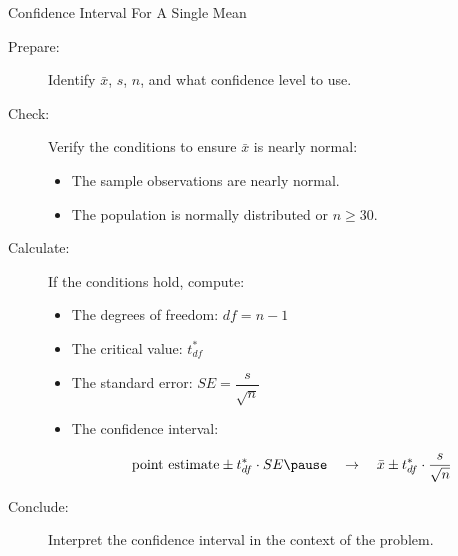 \documentclass{beamer}
\begin{document}
\begin{frame}
  \begin{block}{Confidence Interval For A Single Mean}
    \begin{description}
    \item[Prepare:] Identify $\bar{x}$, $s$, $n$, and what confidence level to use.\pause
    \item[Check:] Verify the conditions to ensure $\bar{x}$ is nearly normal:\pause
      \begin{itemize}
      \item The sample observations are nearly normal.\pause
      \item The population is normally distributed or $n\geq 30$.\pause
      \end{itemize}
    \item[Calculate:] If the conditions hold, compute:\pause
      \begin{itemize}
      \item The degrees of freedom: $df=n-1$\pause
      \item The critical value: $t^*_{df}$\pause
      \item The standard error: $SE=\dfrac{s}{\sqrt{n}}$\pause
      \item The confidence interval:

        \vspace{-4mm}
        \begin{equation*}
          \begin{aligned}
            \text{point estimate} \pm t^*_{df}\cdot SE\pause
            \quad\rightarrow\quad
            \bar{x} \pm t^*_{df}\cdot \dfrac{s}{\sqrt{n}}
          \end{aligned}
        \end{equation*}
      \end{itemize}\pause

      \vspace{-1mm}
    \item[Conclude:] Interpret the confidence interval in the context of the problem.
    \end{description}
  \end{block}
\end{frame}
\end{document}
